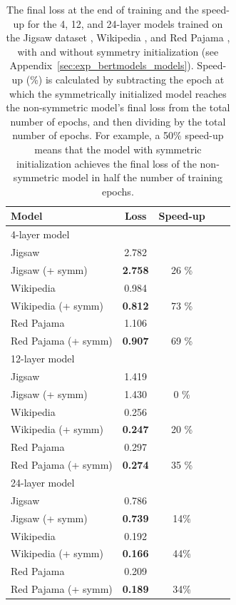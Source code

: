 \begin{table}[H]
\caption{The final loss at the end of training and the speed-up for the 4, 12, and 24-layer models trained on the Jigsaw dataset \citep{jigsaw_challenge}, Wikipedia \citep{wikidump}, and Red Pajama \citep{together2023redpajama}, with and without symmetry initialization (see Appendix~\ref{sec:exp_bertmodels_models}).
%
Speed-up (\%) is calculated by subtracting the epoch at which the symmetrically initialized model reaches the non-symmetric model’s final loss from the total number of epochs, and then dividing by the total number of epochs.
%
For example, a 50\% speed-up means that the model with symmetric initialization achieves the final loss of the non-symmetric model in half the number of training epochs.
%
}
\label{table:symmetric-initialization}
\vskip 0.15in
\begin{center}
\begin{small}
\begin{sc}
\begin{tabular}{lcccr}
\toprule
Model & Loss & Speed-up \\
\midrule\midrule
4-layer model & & \\
\midrule\midrule
Jigsaw & 2.782 & \\
Jigsaw (+ symm) & \textbf{2.758} & 26 \% \\
\midrule
Wikipedia & 0.984& \\
Wikipedia (+ symm) & \textbf{0.812} & 73 \%\\
\midrule
Red Pajama & 1.106 &\\
Red Pajama (+ symm) & \textbf{0.907} & 69 \%\\
\midrule\midrule
12-layer model & & \\
\midrule\midrule
Jigsaw & 1.419 & \\
Jigsaw (+ symm) & 1.430 & 0 \%\\
\midrule
Wikipedia & 0.256 & \\
Wikipedia (+ symm) & \textbf{0.247} & 20 \%\\
\midrule
Red Pajama & 0.297&\\
Red Pajama (+ symm) & \textbf{0.274} & 35 \%\\
\midrule\midrule
24-layer model & & \\
\midrule\midrule
Jigsaw & 0.786 & \\
Jigsaw (+ symm) & \textbf{0.739} &  14\%\\
\midrule
Wikipedia & 0.192 & \\
Wikipedia (+ symm) & \textbf{0.166} &  44\%\\
\midrule
Red Pajama & 0.209 &\\
Red Pajama (+ symm) & \textbf{0.189} &  34\%\\
\bottomrule
\end{tabular}
\end{sc}
\end{small}
\end{center}
\vskip -0.1in
\end{table}